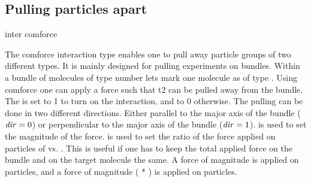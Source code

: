 \subsection{Pulling particles apart}
\begin{essyntax}
  inter  
  comforce    
\end{essyntax}
The comforce interaction type enables one to pull away particle groups
of two different types. It is mainly designed for pulling experiments
on bundles. Within a bundle of molecules of type number 
lets mark one molecule as of type . Using comforce one
can apply a force such that t2 can be pulled away from the bundle. The
 is set to 1 to turn on the interaction, and to 0
otherwise. The pulling can be done in two different directions. Either
parallel to the major axis of the bundle ($\mathrm{\mathit{dir}} = 0$) or
perpendicular to the major axis of the bundle ($\mathrm{\mathit{dir}} = 1$).
 is used to set the magnitude of the force.  
is used to set the ratio of the force applied on particles of
 vs. . This is useful if one has to keep the
total applied force on the bundle and on the target molecule the same.
A force of magnitude  is applied on 
particles, and a force of magnitude ( * ) is
applied on  particles.


